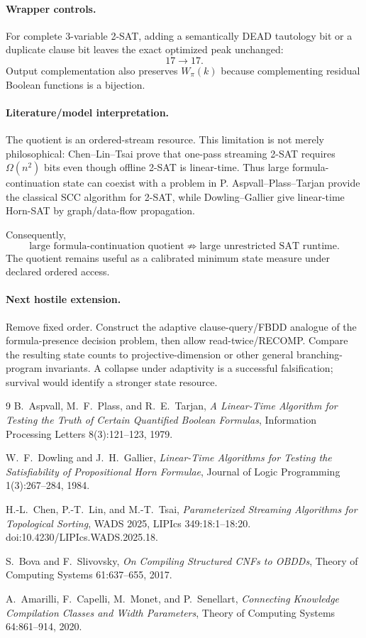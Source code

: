\paragraph{Wrapper controls.}
For complete 3-variable 2-SAT, adding a semantically DEAD tautology bit or a duplicate
clause bit leaves the exact optimized peak unchanged:
\[
17\to17.
\]
Output complementation also preserves $W_\pi(k)$ because complementing residual Boolean
functions is a bijection.

\paragraph{Literature/model interpretation.}
The quotient is an ordered-stream resource.  This limitation is not merely philosophical:
Chen--Lin--Tsai prove that one-pass streaming 2-SAT requires $\Omega(n^2)$ bits even though
offline 2-SAT is linear-time.  Thus large formula-continuation state can coexist with a
problem in P.  Aspvall--Plass--Tarjan provide the classical SCC algorithm for 2-SAT, while
Dowling--Gallier give linear-time Horn-SAT by graph/data-flow propagation.

Consequently,
\[
\boxed{
\text{large formula-continuation quotient}
\not\Rightarrow
\text{large unrestricted SAT runtime}.
}
\]
The quotient remains useful as a calibrated minimum state measure under declared ordered
access.

\paragraph{Next hostile extension.}
Remove fixed order.  Construct the adaptive clause-query/FBDD analogue of the formula-presence
decision problem, then allow read-twice/RECOMP.  Compare the resulting state counts to
projective-dimension or other general branching-program invariants.  A collapse under
adaptivity is a successful falsification; survival would identify a stronger state resource.

\begin{thebibliography}{9}
B.~Aspvall, M.~F.~Plass, and R.~E.~Tarjan,
\emph{A Linear-Time Algorithm for Testing the Truth of Certain Quantified Boolean Formulas},
Information Processing Letters 8(3):121--123, 1979.

W.~F.~Dowling and J.~H.~Gallier,
\emph{Linear-Time Algorithms for Testing the Satisfiability of Propositional Horn Formulae},
Journal of Logic Programming 1(3):267--284, 1984.

H.-L.~Chen, P.-T.~Lin, and M.-T.~Tsai,
\emph{Parameterized Streaming Algorithms for Topological Sorting},
WADS 2025, LIPIcs 349:18:1--18:20.
doi:10.4230/LIPIcs.WADS.2025.18.

S.~Bova and F.~Slivovsky,
\emph{On Compiling Structured CNFs to OBDDs},
Theory of Computing Systems 61:637--655, 2017.

A.~Amarilli, F.~Capelli, M.~Monet, and P.~Senellart,
\emph{Connecting Knowledge Compilation Classes and Width Parameters},
Theory of Computing Systems 64:861--914, 2020.
\end{thebibliography}

